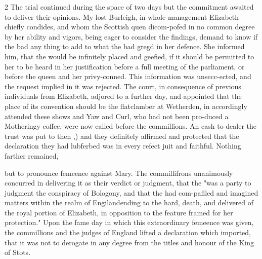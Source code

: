 \documentclass[10pt]{article}
\begin{document}
\begin{multicols}{2}
The trial continued during the space of two days but the commitment awaited to deliver their opinions. My lost Burleigh, in whole management Elizabeth chiefly condides, and whom the Scottish quen dicom-pofed in no common degree by her ability and vigors, being eager to consider the findings, demand to know if the bad any thing to add to what the bad gregd in her defence. She informed him, that the would be infinitely placed and geefied, if it should be permitted to her to be heard in her justification before a full meeting of the parliament, or before the queen and her privy-conned. This information was unsecc-ected, and the request implied in it was rejected. The court, in consequence of previous individuals from Elizabeth, adjored to a further day, and appointed that the place of its convention should be the flatclamber at Wetherden, in accordingly attended these shows and Yaw and Curl, who had not been pro-duced a Motheringy coffee, were now called before the commillions. An cash to dealer the trust was put to then ,) and they definitely affirmed and protected that the declaration they had lubferbed was in every refect juit and faithful. Nothing farther remained,

but to pronounce femeence against Mary. The commillifrons unanimously concurred in delivering it as their verdict or judgment, that the "was a party to judgment the conspiracy of Bologony, and that the had com-pafiled and imagined matters within the realm of Engilandending to the hard, death, and delivered of the royal portion of Elizabeth, in opposition to the feature framed for her protection." Upon the fame day in which this extraordinary femeence was given, the commillions and the judges of England lifted a declaration which imported, that it was not to derogate in any degree from the titles and honour of the King of Stots.


\end{multicols}
\end{document}
